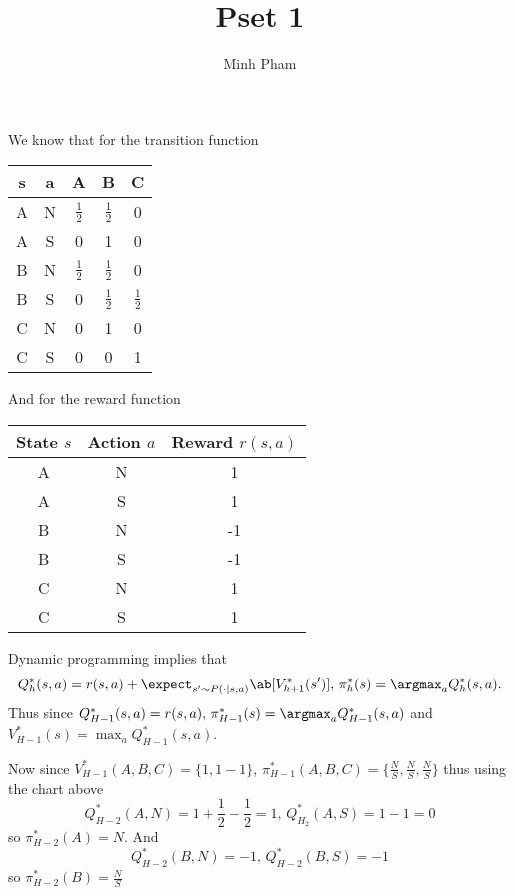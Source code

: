 \documentclass[12pt]{amsart}
\title{Pset 1}
\author{Minh Pham}
\begin{document}
  \maketitle
  \begin{problem}
    \begin{subproblem}
      We know that for the transition function
      \begin{center}
      \begin{tabular}{|c|c|c|c|c|}
        \hline 
        s & a & A & B & C \\
        \hline
        A & N & $\frac12$ & $\frac12$ & 0 \\ 
        A & S & 0 & 1 & 0 \\ 
        B & N & $\frac12$ & $\frac12$ & 0 \\
        B & S & 0 & $\frac12$ & $\frac12$ \\ 
        C & N & 0 & 1 & 0 \\ 
        C & S & 0 & 0 & 1 \\
        \hline
      \end{tabular}
      \end{center}
      
      And for the reward function
      \begin{center}
      \begin{tabular}{|c|c|c|}
        \hline
        \textbf{State \( s \)} & \textbf{Action \( a \)} & \textbf{Reward \( r(s, a) \)} \\
        \hline
        A & N & 1 \\
        A & S & 1 \\
        B & N & -1 \\
        B & S & -1 \\
        C & N & 1 \\
        C & S & 1 \\
        \hline
    \end{tabular} 
    \end{center}
    \end{subproblem} 
    \begin{subproblem}
      Dynamic programming implies that 
      \[Q_h^*(s,a) = r(s,a) + \expect_{s'\sim P(\cdot|s,a)}\ab[V_{h+1}^*(s')],\, \pi_h^*(s) = \argmax_a Q_h^*(s,a).\]
      Thus since $Q^*_{H-1}(s,a)=r(s,a),\, \pi_{H-1}^*(s)=\argmax_a Q^*_{H-1}(s,a)$ and $V_{H-1}^*(s)=\max_a Q_{H-1}^*(s,a)$. 

      Now since $V_{H-1}^*(A,B,C) = \{1,1-1\}$, $\pi_{H-1}^*(A,B,C) = \{\frac NS,\frac NS, \frac NS\}$ thus using the chart above 
      \[Q_{H-2}^*(A,N) = 1 +\frac12-\frac12 = 1,\, Q_{H_2}^*(A,S) = 1-1=0\] so $\pi_{H-2}^*(A)=N$. 
      And 
      \[Q_{H-2}^*(B,N)= -1,\, Q_{H-2}^*(B,S) = -1\] so $\pi_{H-2}^*(B) = \frac NS$


\end{subproblem}
\end{problem}
\end{document}
